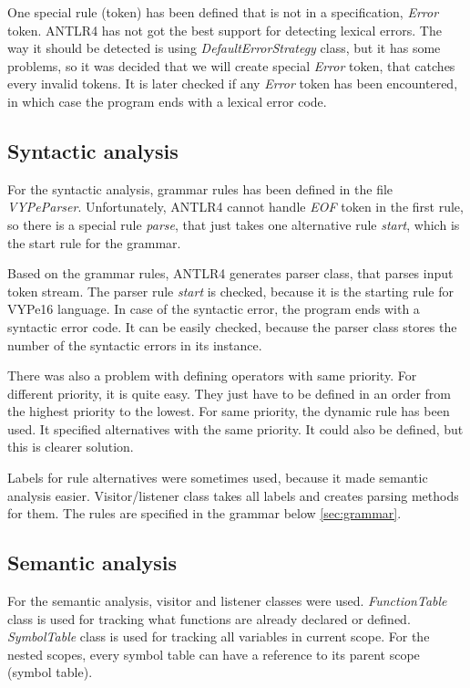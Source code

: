 One special rule (token) has been defined that is not in a specification, \textit{Error} token. ANTLR4 has not got the best support for detecting lexical errors. The way it should be detected is using \textit{DefaultErrorStrategy} class, but it has some problems, so it was decided that we will create special \textit{Error} token, that catches every invalid tokens. It is later checked if any \textit{Error} token has been encountered, in which case the program ends with a lexical error code.


\subsection{Syntactic analysis}
\label{sec:syntax}
For the syntactic analysis, grammar rules has been defined in the file \textit{VYPeParser}. Unfortunately, ANTLR4 cannot handle \textit{EOF} token in the first rule, so there is a special rule \textit{parse}, that just takes one alternative rule \textit{start}, which is the start rule for the grammar.

Based on the grammar rules, ANTLR4 generates parser class, that parses input token stream. The parser rule \textit{start} is checked, because it is the starting rule for VYPe16 language. In case of the syntactic error, the program ends with a syntactic error code. It can be easily checked, because the parser class stores the number of the syntactic errors in its instance.

There was also a problem with defining operators with same priority. For different priority, it is quite easy. They just have to be defined in an order from the highest priority to the lowest. For same priority, the dynamic rule has been used. It specified alternatives with the same priority. It could also be defined, but this is clearer solution.

Labels for rule alternatives were sometimes used, because it made semantic analysis easier. Visitor/listener class takes all labels and creates parsing methods for them. The rules are specified in the grammar below \ref{sec:grammar}. 

\subsection{Semantic analysis}
For the semantic analysis, visitor and listener classes were used. \textit{FunctionTable} class is used for tracking what functions are already declared or defined. \textit{SymbolTable} class is used for tracking all variables in current scope. For the nested scopes, every symbol table can have a reference to its parent scope (symbol table).

